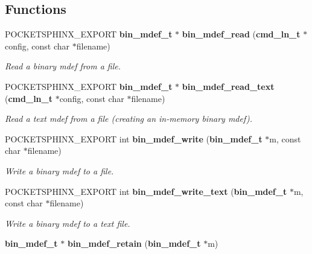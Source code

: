 \subsection*{\-Functions}
\begin{DoxyCompactItemize}
\item 
\-P\-O\-C\-K\-E\-T\-S\-P\-H\-I\-N\-X\-\_\-\-E\-X\-P\-O\-R\-T {\bf bin\-\_\-mdef\-\_\-t} $\ast$ {\bf bin\-\_\-mdef\-\_\-read} ({\bf cmd\-\_\-ln\-\_\-t} $\ast$config, const char $\ast$filename)\label{bin__mdef_8h_a3930ae6b3309a615335585db4b46306f}

\begin{DoxyCompactList}\small\item\em \-Read a binary mdef from a file. \end{DoxyCompactList}\item 
\-P\-O\-C\-K\-E\-T\-S\-P\-H\-I\-N\-X\-\_\-\-E\-X\-P\-O\-R\-T {\bf bin\-\_\-mdef\-\_\-t} $\ast$ {\bf bin\-\_\-mdef\-\_\-read\-\_\-text} ({\bf cmd\-\_\-ln\-\_\-t} $\ast$config, const char $\ast$filename)\label{bin__mdef_8h_a00dab94d45d1adc5f7778fd1e2398031}

\begin{DoxyCompactList}\small\item\em \-Read a text mdef from a file (creating an in-\/memory binary mdef). \end{DoxyCompactList}\item 
\-P\-O\-C\-K\-E\-T\-S\-P\-H\-I\-N\-X\-\_\-\-E\-X\-P\-O\-R\-T int {\bf bin\-\_\-mdef\-\_\-write} ({\bf bin\-\_\-mdef\-\_\-t} $\ast$m, const char $\ast$filename)\label{bin__mdef_8h_a982b8e598afed47805fab1509e8fc4bb}

\begin{DoxyCompactList}\small\item\em \-Write a binary mdef to a file. \end{DoxyCompactList}\item 
\-P\-O\-C\-K\-E\-T\-S\-P\-H\-I\-N\-X\-\_\-\-E\-X\-P\-O\-R\-T int {\bf bin\-\_\-mdef\-\_\-write\-\_\-text} ({\bf bin\-\_\-mdef\-\_\-t} $\ast$m, const char $\ast$filename)\label{bin__mdef_8h_af89d79226df33947019efcfe7377d586}

\begin{DoxyCompactList}\small\item\em \-Write a binary mdef to a text file. \end{DoxyCompactList}\item 
{\bf bin\-\_\-mdef\-\_\-t} $\ast$ {\bf bin\-\_\-mdef\-\_\-retain} ({\bf bin\-\_\-mdef\-\_\-t} $\ast$m)\label{bin__mdef_8h_a297167f03662a9cbd650743d3f4cf8f8}


\end{DoxyCompactItemize}
